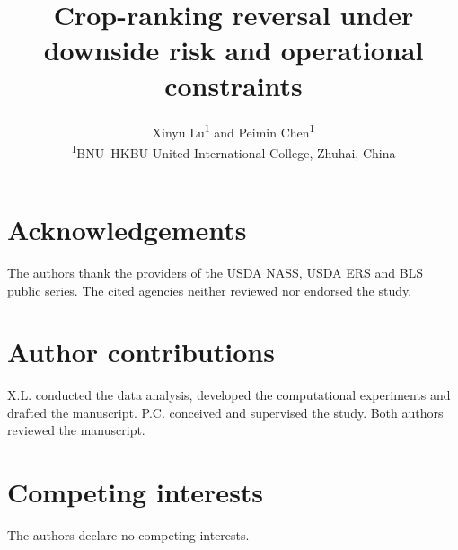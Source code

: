 \documentclass[11pt]{article}
\title{\textbf{Crop-ranking reversal under downside risk and operational constraints}}
\author{Xinyu Lu\textsuperscript{1} and Peimin Chen\textsuperscript{1}\\[3pt]
\small\textsuperscript{1}BNU--HKBU United International College, Zhuhai, China}
\date{}
\begin{document}
\maketitle










\section*{Acknowledgements}
The authors thank the providers of the USDA NASS, USDA ERS and BLS public
series. The cited agencies neither reviewed nor endorsed the study.
\section*{Author contributions}
X.L. conducted the data analysis, developed the computational experiments and
drafted the manuscript. P.C. conceived and supervised the study. Both authors
reviewed the manuscript.
\section*{Competing interests}
The authors declare no competing interests.

\begingroup\footnotesize

\endgroup
\end{document}
